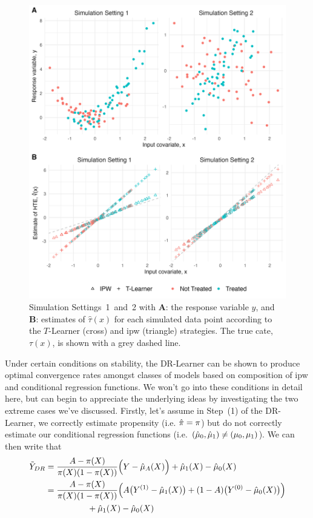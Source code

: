 \documentclass[../thesis.tex]{subfiles}
\begin{document}
\begin{figure}[!tpb] 
\centering
\includegraphics[width=\textwidth]{figures/chapter4/comp_figure_without_dr.png}
\caption{Simulation Settings~1~and~2 with \textbf{A}: the response variable $y$, and \textbf{B}: estimates of $\hat{\tau}(x)$ for each simulated data point according to the $T$-Learner (cross) and \gls{ipw} (triangle) strategies. The true \gls{cate}, $\tau(x)$, is shown with a grey dashed line.  \label{fig:comp_t_ipw}}
\end{figure}
Under certain conditions on stability, the DR-Learner can be shown to produce optimal convergence rates amongst classes of models based on composition of \gls{ipw} and conditional regression functions. We won't go into these conditions in detail here, but can begin to appreciate the underlying ideas by investigating the two extreme cases we've discussed. Firstly, let's assume in Step~(1) of the DR-Learner, we correctly estimate propensity (i.e. $\hat{\pi} = \pi$) but do not correctly estimate our conditional regression functions (i.e. $(\hat{\mu}_0, \hat{\mu}_1) \neq (\mu_0, \mu_1)$). We can then write that 
\begin{align*}
    \Tilde{Y}_{DR} & =  \frac{A - {\pi}(X)}{{\pi}(X)(1-{\pi}(X))}\Big( Y - \hat{\mu}_A(X)\Big) + \hat{\mu}_1(X) - \hat{\mu}_0(X) \\
    & = \frac{A - {\pi}(X)}{{\pi}(X)(1-{\pi}(X))}\Big(A\big(Y^{(1)} - \hat{\mu}_1(X)\big) + (1-A)\big(Y^{(0)} - \hat{\mu}_0(X) \big)\Big) \\
    & \hspace{50pt} + \hat{\mu}_1(X) - \hat{\mu}_0(X)
\end{align*}
\end{document}
